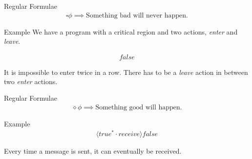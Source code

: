 \documentclass{beamer}
\begin{document}
  \begin{frame}{Regular Formulae}
    \begin{align*}
      \square\phi \implies \text{Something bad will never happen.}
    \end{align*}

    \begin{exampleblock}{Example}
      We have a program with a critical region and two actions, \textit{enter} and \textit{leave}.

      \begin{align*}
        [true^*\cdot enter \cdot \overline{leave}^* \cdot enter]false
      \end{align*}

      It is impossible to enter twice in a row. There has to be a \textit{leave} action in between two \textit{enter} actions.
    \end{exampleblock}
  \end{frame}

  \begin{frame}{Regular Formulae}
    \begin{align*}
      \diamond\phi \implies \text{Something good will happen.}
    \end{align*}

    \begin{exampleblock}{Example}
      \begin{align*}
        [true^*\cdot send]\langle true^* \cdot receive \rangle false
      \end{align*}

      Every time a message is sent, it can eventually be received.
    \end{exampleblock}
  \end{frame}
\end{document}
